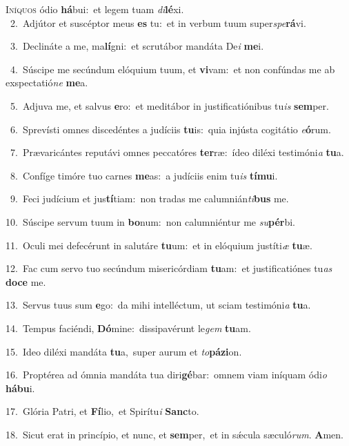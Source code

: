 \lettrine{\initial\textcolor{\initialcolor}{I}}{níquos} ódio \textbf{há}\-bui:~\star et legem tuam \textit{di}\-\textbf{lé}xi.\\
{\numbfont\textcolor{\numbcolor}{~2.}}~Adjútor et suscéptor meus \textbf{es} tu:~\star et in verbum tuum super\-\textit{spe}\-\textbf{rá}vi.\par
{\numbfont\textcolor{\numbcolor}{~3.}}~Declináte a me, ma\-\textbf{lí}\-gni:~\star et scrutábor mandáta De\textit{i} \textbf{me}\-i.\par
{\numbfont\textcolor{\numbcolor}{~4.}}~Súscipe me secúndum elóquium tuum, et \textbf{vi}\-vam:~\star et non confúndas me ab exspectatió\textit{ne} \textbf{me}\-a.\par
{\numbfont\textcolor{\numbcolor}{~5.}}~Adjuva me, et salvus \textbf{e}\-ro:~\star et meditábor in justificatiónibus tu\textit{is} \textbf{sem}\-per.\par
{\numbfont\textcolor{\numbcolor}{~6.}}~Sprevísti omnes discedéntes a judíciis \textbf{tu}\-is:~\star quia injústa cogitátio \textit{e}\-\textbf{ó}rum.\par
{\numbfont\textcolor{\numbcolor}{~7.}}~Prævaricántes reputávi omnes peccatóres \textbf{ter}\-ræ:~\star ídeo diléxi testimóni\textit{a} \textbf{tu}\-a.\par
{\numbfont\textcolor{\numbcolor}{~8.}}~Confíge timóre tuo carnes \textbf{me}\-as:~\star a judíciis enim tu\textit{is} \textbf{tí}\-\textbf{mu}i.\par
{\numbfont\textcolor{\numbcolor}{~9.}}~Feci judícium et jus\-\textbf{tí}\-tiam:~\star non tradas me calumnián\-\textit{ti}\-\textbf{bus} me.\par
{\numbfont\textcolor{\numbcolor}{10.}}~Súscipe servum tuum in \textbf{bo}\-num:~\star non calumniéntur me \textit{su}\-\textbf{pér}bi.\par
{\numbfont\textcolor{\numbcolor}{11.}}~Oculi mei defecérunt in salutáre \textbf{tu}\-um:~\star et in elóquium justíti\textit{æ} \textbf{tu}\-æ.\par
{\numbfont\textcolor{\numbcolor}{12.}}~Fac cum servo tuo secúndum misericórdiam \textbf{tu}\-am:~\star et justificatiónes tu\textit{as} \textbf{do}\-\textbf{ce} me.\par
{\numbfont\textcolor{\numbcolor}{13.}}~Servus tuus sum \textbf{e}\-go:~\star da mihi intelléctum, ut sciam testimóni\textit{a} \textbf{tu}\-a.\par
{\numbfont\textcolor{\numbcolor}{14.}}~Tempus faciéndi, \textbf{Dó}\-mine:~\star dissipavérunt le\textit{gem} \textbf{tu}\-am.\par
{\numbfont\textcolor{\numbcolor}{15.}}~Ideo diléxi mandáta \textbf{tu}\-a,~\star super aurum et \textit{to}\-\textbf{pá}\textbf{zi}on.\par
{\numbfont\textcolor{\numbcolor}{16.}}~Proptérea ad ómnia mandáta tua diri\-\textbf{gé}\-bar:~\star omnem viam iníquam ódi\textit{o} \textbf{há}\-\textbf{bu}i.\par
{\numbfont\textcolor{\numbcolor}{17.}}~Glória Patri, et \textbf{Fí}\-lio,~\star et Spirítu\textit{i} \textbf{Sanc}\-to.\par
{\numbfont\textcolor{\numbcolor}{18.}}~Sicut erat in princípio, et nunc, et \textbf{sem}\-per,~\star et in sǽcula sæculó\-\textit{rum}\-. \textbf{A}\-men.\par
